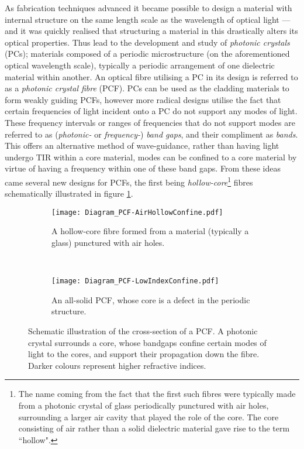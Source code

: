 As fabrication techniques advanced it became possible to design a material with internal structure on the same length scale as the wavelength of optical light --- and it was quickly realised that structuring a material in this drastically alters its optical properties.
Thus lead to the development and study of \emph{photonic crystals} (PCs); materials composed of a periodic microstructure (on the aforementioned optical wavelength scale), typically a periodic arrangement of one dielectric material within another.
An optical fibre utilising a PC in its design is referred to as a \emph{photonic crystal fibre} (PCF).
PCs can be used as the cladding materials to form weakly guiding PCFs, however more radical designs utilise the fact that certain frequencies of light incident onto a PC do not support any modes of light.
These frequency intervals or ranges of frequencies that do not support modes are referred to as (\emph{photonic-} or \emph{frequency-}) \emph{band gaps}, and their compliment as \emph{bands}.
This offers an alternative method of wave-guidance, rather than having light undergo TIR within a core material, modes can be confined to a core material by virtue of having a frequency within one of these band gaps.
From these ideas came several new designs for PCFs, the first being \emph{hollow-core}\footnote{The name coming from the fact that the first such fibres were typically made from a photonic crystal of glass periodically punctured with air holes, surrounding a larger air cavity that played the role of the core. The core consisting of air rather than a solid dielectric material gave rise to the term ``hollow".} fibres schematically illustrated in figure \ref{fig:Diagram_PCF-AirHollowConfine.pdf}.
\begin{figure}[b!]
	\centering
	\begin{subfigure}[t]{0.45\textwidth}
		\centering
		\texttt{[image: Diagram\_PCF-AirHollowConfine.pdf]}
		\caption[]{\label{fig:Diagram_PCF-AirHollowConfine.pdf} A hollow-core fibre formed from a material (typically a glass) punctured with air holes.}
	\end{subfigure}
	~
	\begin{subfigure}[t]{0.45\textwidth}
		\centering
		\texttt{[image: Diagram\_PCF-LowIndexConfine.pdf]}
		\caption[]{\label{fig:Diagram_PCF-LowIndexConfine.pdf} An all-solid PCF, whose core is a defect in the periodic structure.}
	\end{subfigure}
	\caption[Schematic illustration of the cross-section of a photonic crystal fibre.]{\label{fig:Diagram_PCF} Schematic illustration of the cross-section of a PCF. A photonic crystal surrounds a core, whose bandgaps confine certain modes of light to the cores, and support their propagation down the fibre. Darker colours represent higher refractive indices.}
\end{figure}
